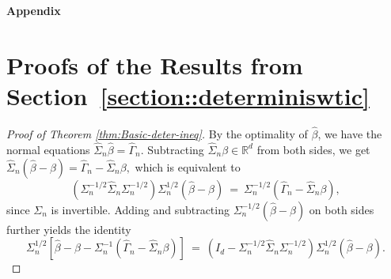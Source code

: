 \documentclass[11pt]{article}
\begin{document}
\begin{appendices}

\begin{center}
{\Large {\bf Appendix}}
\end{center}

\section{Proofs of the Results from Section~\ref{section::determiniswtic}}
\label{appendix:deterministic}


\begin{proof}[Proof of Theorem \ref{thm:Basic-deter-ineq}]
By the optimality of $\widehat{\beta}$, we have the normal equations $\widehat{\Sigma}_n\widehat{\beta} = \widehat{\Gamma}_n.$
Subtracting $\widehat{\Sigma}_n\beta\in\mathbb{R}^d$ from both sides, we get
$\widehat{\Sigma}_n(\widehat{\beta} - \beta) = \widehat{\Gamma}_n - \widehat{\Sigma}_n\beta,$
which is equivalent to
\[\textstyle
(\Sigma^{-1/2}_n\widehat{\Sigma}_n\Sigma_n^{-1/2})\Sigma^{1/2}_n(\widehat{\beta} - \beta) ~=~ \Sigma^{-1/2}_n(\widehat{\Gamma}_n - \widehat{\Sigma}_n\beta),
\]
since $\Sigma_n$ is invertible.
Adding and subtracting $\Sigma^{-1/2}_n (\widehat{\beta}  - \beta)$ on both sides further yields the identity
\[
\Sigma ^{1/2}_n\left[\widehat{\beta}  - \beta  - \Sigma ^{-1}_n(\widehat{\Gamma}_n  - \widehat{\Sigma}_n \beta )\right] ~=~ (I_d - \Sigma_n ^{-1/2}\widehat{\Sigma}_n \Sigma_n ^{-1/2})\Sigma_n ^{1/2}(\widehat{\beta}  - \beta ).
\]
\end{proof}
\end{appendices}
\end{document}
